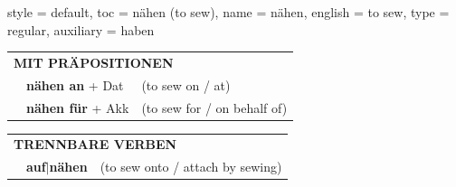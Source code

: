 \begin{verbentry}{
  style = {default},
  toc = {nähen (to sew)},
  name = {nähen},
  english = {to sew},
  type = {regular},
  auxiliary = {haben}
}
\vspace{10pt}

\begin{tabular}{lll}
\multicolumn{3}{l}{\textbf{MIT PRÄPOSITIONEN}}\\
& \textbf{nähen an} + Dat & (to sew on / at)\\
& \textbf{nähen für} + Akk & (to sew for / on behalf of)\\
\end{tabular}
\hfill
\begin{tabular}{lll}
\multicolumn{3}{l}{\textbf{TRENNBARE VERBEN}}\\
& \textbf{auf$|$nähen} & (to sew onto / attach by sewing)\\
\end{tabular}
\vspace{-5pt}
\end{verbentry}

